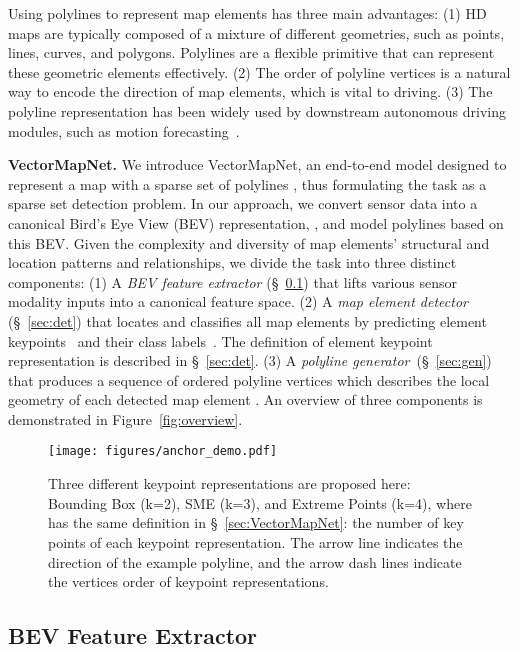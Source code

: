 \documentclass{article}
\theoremstyle{plain}
\theoremstyle{definition}
\theoremstyle{remark}
\begin{document}
Using polylines to represent map elements has three main advantages: 
(1) HD maps are typically composed of a mixture of different geometries, such as points, lines, curves, and polygons. Polylines are a flexible primitive that can represent these geometric elements effectively. 
(2) The order of polyline vertices is a natural way to encode the direction of map elements, which is vital to driving. 
(3) The polyline representation has been widely used by downstream autonomous driving modules, such as motion forecasting~\citep{vectornet}.


\noindent\textbf{VectorMapNet.} We introduce VectorMapNet, an end-to-end model designed to represent a map  with a sparse set of polylines , thus formulating the task as a sparse set detection problem. In our approach, we convert sensor data into a canonical Bird's Eye View (BEV) representation, , and model polylines based on this BEV. Given the complexity and diversity of map elements' structural and location patterns and relationships, we divide the task into three distinct components: (1) A \textit{BEV feature extractor} (\S~\ref{sec:bev_backbone}) that lifts various sensor modality inputs into a canonical feature space.
(2) A \textit{map element detector} (\S~\ref{sec:det}) that locates and classifies all map elements by predicting element keypoints~ and their class labels~. 
The definition of element keypoint representation  is described in \S~\ref{sec:det}.
(3) A \textit{polyline generator}~(\S~\ref{sec:gen}) that produces a sequence of ordered polyline vertices which describes the local geometry of each detected map element .
An overview of three components is demonstrated in Figure~\ref{fig:overview}.


\begin{figure*}[t]
    \centering
    \texttt{[image: figures/anchor\_demo.pdf]}
    \vspace{-1em}
    \caption{Three different keypoint representations are proposed here: Bounding Box (k=2), SME (k=3), and Extreme Points (k=4), where  has the same definition in \S~\ref{sec:VectorMapNet}: the number of key points of each keypoint representation. The arrow line indicates the direction of the example polyline, and the arrow dash lines indicate the vertices order of keypoint representations.
    }
    \label{fig:anchor}
    \vspace{-1em}
\end{figure*}

\subsection{BEV Feature Extractor}
\label{sec:bev_backbone}
\end{document}
